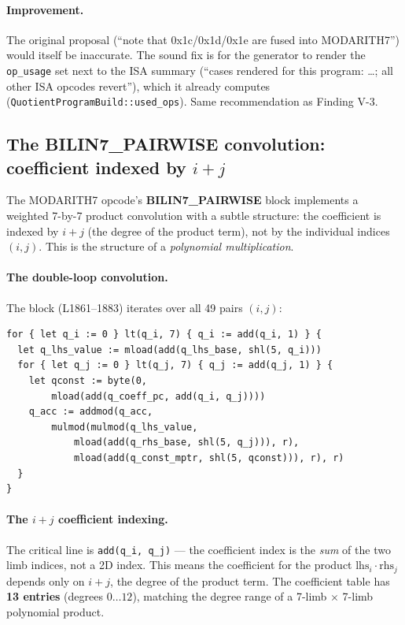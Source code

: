 \paragraph{Improvement.}  The original proposal
(``note that 0x1c/0x1d/0x1e are fused into MODARITH7'') would
itself be inaccurate. The sound fix is for the generator to render
the \texttt{op\_usage} set next to the ISA summary (``cases
rendered for this program: \ldots; all other ISA opcodes revert''),
which it already computes (\texttt{QuotientProgramBuild::used\_\allowbreak{}ops}).
Same recommendation as Finding V-3.

\subsection{The BILIN7\_PAIRWISE convolution: coefficient indexed by $i{+}j$}
\label{sec:pr-pairwise}

The MODARITH7 opcode's \textbf{BILIN7\_PAIRWISE} block implements
a weighted 7-by-7 product convolution with a subtle structure:
the coefficient is indexed by $i + j$ (the degree of the product
term), not by the individual indices $(i, j)$. This is the
structure of a \emph{polynomial multiplication}.

\paragraph{The double-loop convolution.} The block (L1861--1883)
iterates over all 49 pairs $(i, j)$:
\begin{lstlisting}[style=yul]
for { let q_i := 0 } lt(q_i, 7) { q_i := add(q_i, 1) } {
  let q_lhs_value := mload(add(q_lhs_base, shl(5, q_i)))
  for { let q_j := 0 } lt(q_j, 7) { q_j := add(q_j, 1) } {
    let qconst := byte(0,
        mload(add(q_coeff_pc, add(q_i, q_j))))
    q_acc := addmod(q_acc,
        mulmod(mulmod(q_lhs_value,
            mload(add(q_rhs_base, shl(5, q_j))), r),
            mload(add(q_const_mptr, shl(5, qconst))), r), r)
  }
}
\end{lstlisting}

\paragraph{The $i{+}j$ coefficient indexing.} The critical line
is \texttt{add(q\_i, q\_j)} --- the coefficient index is the
\emph{sum} of the two limb indices, not a 2D index. This means
the coefficient for the product $\text{lhs}_i \cdot \text{rhs}_j$
depends only on $i + j$, the degree of the product term. The
coefficient table has \textbf{13 entries} (degrees $0 \dots 12$),
matching the degree range of a 7-limb $\times$ 7-limb polynomial
product.

